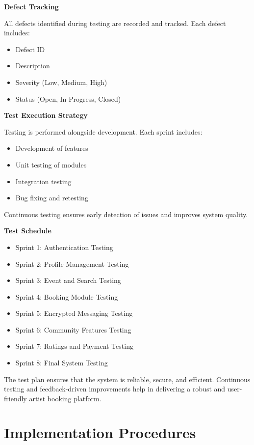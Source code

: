 \documentclass[12pt,a4paper]{report}
\begin{document}
\textbf{Defect Tracking}

All defects identified during testing are recorded and tracked. Each defect includes:

\begin{itemize}
\item Defect ID
\item Description
\item Severity (Low, Medium, High)
\item Status (Open, In Progress, Closed)
\end{itemize}

\textbf{Test Execution Strategy}

Testing is performed alongside development. Each sprint includes:

\begin{itemize}
\item Development of features
\item Unit testing of modules
\item Integration testing
\item Bug fixing and retesting
\end{itemize}

Continuous testing ensures early detection of issues and improves system quality.

\textbf{Test Schedule}

\begin{itemize}
\item Sprint 1: Authentication Testing
\item Sprint 2: Profile Management Testing
\item Sprint 3: Event and Search Testing
\item Sprint 4: Booking Module Testing
\item Sprint 5: Encrypted Messaging Testing
\item Sprint 6: Community Features Testing
\item Sprint 7: Ratings and Payment Testing
\item Sprint 8: Final System Testing
\end{itemize}

The test plan ensures that the system is reliable, secure, and efficient. Continuous testing and feedback-driven improvements help in delivering a robust and user-friendly artist booking platform.

\section{Implementation Procedures}
\end{document}
